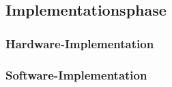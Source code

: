\documentclass[../../../Bachelorarbeit.tex]{subfiles}
\begin{document}
\subsection{Implementationsphase}
\blindtext[1]

\subsubsection{Hardware-Implementation}
\blindtext[1]

\subsubsection{Software-Implementation}
\blindtext[1]
\end{document}
